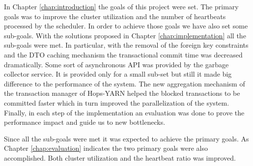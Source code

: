 In Chapter \ref{chap:introduction} the goals of this project were
set. The primary goals was to improve the cluster utilization and the
number of heartbeats processed by the scheduler. In order to achieve
those goals we have also set some sub-goals. With the solutions proposed
in Chapter \ref{chap:implementation} all the sub-goals were met. In
particular, with the removal of the foreign key constraints and the
DTO caching mechanism the transactional commit time was decreased
dramatically. Some sort of asynchronous API was provided by the
garbage collector service. It is provided only for a small sub-set but
still it made big difference to the performance of the system. The new
aggregation mechanism of the transaction manager of Hops-YARN helped
the blocked transactions to be committed faster which in turn improved the
parallelization of the system. Finally, in each step of the
implementation an evaluation was done to prove the performance impact
and guide us to new bottlenecks.

Since all the sub-goals were met it was expected to achieve the
primary goals. As Chapter \ref{chap:evaluation} indicates the two
primary goals were also accomplished. Both cluster utilization and the
heartbeat ratio was improved.
